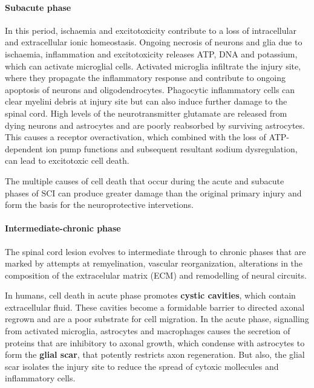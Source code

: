 \documentclass[12pt,article,oneside,a4paper]{memoir}
\begin{document}
\paragraph{Subacute phase}
In this period, ischaemia and excitotoxicity contribute to a loss of
intracellular and extracellular ionic homeostasis. Ongoing necrosis of neurons
and glia due to ischaemia, inflammation and excitotoxicity releases ATP, DNA
and potassium, which can activate microglial cells. Activated microglia
infiltrate the injury site, where they propagate the inflammatory response and
contribute to ongoing apoptosis of neurons and oligodendrocytes. Phagocytic
inflammatory cells can clear myelini debris at injury site but can also induce
further damage to the spinal cord. High levels of the neurotransmitter
glutamate are released from dying neurons and astrocytes and are poorly
reabsorbed by surviving astrocytes. This causes a receptor overactivation,
which combined with the loss of ATP-dependent ion pump functions and subsequent
resultant sodium dysregulation, can lead to excitotoxic cell death.

The multiple causes of cell death that occur during the acute and subacute
phases of SCI can produce greater damage than the original primary injury and
form the basis for the neuroprotective intervetions.

\paragraph{Intermediate-chronic phase}
The spinal cord lesion evolves to intermediate through to chronic phases that
are marked by attempts at remyelination, vascular reorganization, alterations
in the composition of the extracelular matrix (ECM) and remodelling of neural
circuits.

In humans, cell death in acute phase promotes \textbf{cystic cavities}, which
contain extracellular fluid. These cavities become a formidable barrier to
directed axonal regrown and are a poor substrate for cell migration. In the
acute phase, signalling from activated microglia, astrocytes and macrophages
causes the secretion of proteins that are inhibitory to axonal growth, which
condense with astrocytes to form the \textbf{glial scar}, that potently
restricts axon regeneration. But also, the glial scar isolates the injury site
to reduce the spread of cytoxic mollecules and inflammatory cells.
\end{document}
